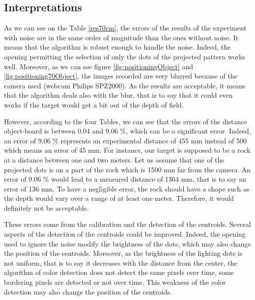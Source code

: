 \subsection{Interpretations}
As we can see on the Table \ref{res70cm}, the errors of the results of the experiment with noise are in the same order of magnitude than the ones without noise. It means that the algorithm is robust enough to handle the noise. Indeed, the 
opening permitting the selection of only the dots of the projected pattern works well. Moreover, as we can see figure \ref{fig:positioningObject} and \ref{fig:positioning70Object}, the images recorded are very blurred because of the camera used (webcam Philips SPZ2000). As the results are acceptable, it means that the algorithm deals also with the blur, that is to say that it could even works if the target would get a bit out of the depth of field.

However, according to the four Tables, we can see that the errors of the distance object-board is between 0.04 and 9.06 \%, which can be a significant error. Indeed, an error of 9.06 \% represents an experimental distance of 455 mm instead of 500 which means an error of 45 mm. For instance, our target is supposed to be a rock at a distance between one and two meters. Let us assume that one of the projected dots is on a part of the rock which is 1500 mm far from the camera. An error of 9.06 \% would lead to a measured distance of 1364 mm, that is to say an error of 136 mm. To have a negligible error, the rock should have a shape such as the depth would vary over a range of at least one meter. Therefore, it would definitely not be acceptable.

These errors come from the calibration and the detection of the centroids. Several aspects of the detection of the centroids could be improved. Indeed, the opening used to ignore the noise modify the brightness of the dots, which may also change the position of the centroids. Moreover, as the brightness of the lighting dots is not uniform, that is to say it decreases with the distance from the center, the algorithm of color detection does not detect the same pixels over time, some bordering pixels are detected or not over time. This weakness of the color detection may also change the position of the centroids.

